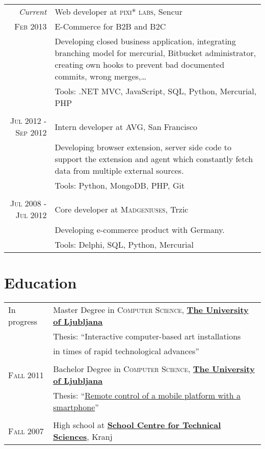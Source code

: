 \documentclass[a4paper,10pt]{article} %
\begin{document}
\begin{tabular}{r|p{10cm}}
\emph{Current} & Web developer at \textsc{pixi* labs}, Sencur \\
\textsc{Feb 2013} & E-Commerce for B2B and B2C\\
& \footnotesize{Developing closed business application, integrating branching model for mercurial, Bitbucket administrator, creating own hooks to prevent bad documented commits, wrong merges,\dots} \\
& \footnotesize{Tools: .NET MVC, JavaScript, SQL, Python, Mercurial, PHP} \\
\multicolumn{2}{c}{} \\

\textsc{Jul 2012 - Sep 2012} & Intern developer at \textsc{AVG}, San Francisco \emph{}\\
& \footnotesize{Developing browser extension, server side code to support the extension and agent which constantly fetch data from multiple external sources.} \\
& \footnotesize{Tools: Python, MongoDB, PHP, Git} \\ 
\multicolumn{2}{c}{} \\

\textsc{Jul 2008 - Jul 2012} & Core developer at \textsc{Madgeniuses}, Trzic \emph{}\\
& \footnotesize{Developing e-commerce product with Germany.}\\
& \footnotesize{Tools: Delphi, SQL, Python, Mercurial}\\
\end{tabular}


\section{Education}

\begin{tabular}{p{2cm}l}	
\hfill In progress & Master Degree in \textsc{Computer Science}, \href{www.fri.uni-lj.si}{\textbf{The University of Ljubljana}} \\
& Thesis: ``Interactive computer-based art installations\\ & \hphantom{Thesis: ``}in times of rapid technological advances'' \\
\\

\hfill \textsc{Fall} 2011 & Bachelor Degree in \textsc{Computer Science}, \href{www.fri.uni-lj.si}{\textbf{The University of Ljubljana}} \\
& Thesis: ``\href{https://github.com/majcn/roomba}{Remote control of a mobile platform with a smartphone}'' \\
\\

\hfill \textsc{Fall} 2007 & High school at \href{http://www.sckr.si/}{\textbf{School Centre for Technical Sciences}}, Kranj\\
\end{tabular}
\end{document}

